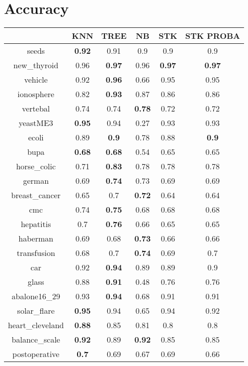 \documentclass{article}%
\begin{document}
%
\normalsize%
\section*{Accuracy}%
\begin{tabular}{c|ccccc}%
&KNN&TREE&NB&STK&STK PROBA\\%
\hline%
seeds&\textbf{0.92}&0.91&0.9&0.9&0.9\\%
new\_thyroid&0.96&\textbf{0.97}&0.96&\textbf{0.97}&\textbf{0.97}\\%
vehicle&0.92&\textbf{0.96}&0.66&0.95&0.95\\%
ionosphere&0.82&\textbf{0.93}&0.87&0.86&0.86\\%
vertebal&0.74&0.74&\textbf{0.78}&0.72&0.72\\%
yeastME3&\textbf{0.95}&0.94&0.27&0.93&0.93\\%
ecoli&0.89&\textbf{0.9}&0.78&0.88&\textbf{0.9}\\%
bupa&\textbf{0.68}&\textbf{0.68}&0.54&0.65&0.65\\%
horse\_colic&0.71&\textbf{0.83}&0.78&0.78&0.78\\%
german&0.69&\textbf{0.74}&0.73&0.69&0.69\\%
breast\_cancer&0.65&0.7&\textbf{0.72}&0.64&0.64\\%
cmc&0.74&\textbf{0.75}&0.68&0.68&0.68\\%
hepatitis&0.7&\textbf{0.76}&0.66&0.65&0.65\\%
haberman&0.69&0.68&\textbf{0.73}&0.66&0.66\\%
transfusion&0.68&0.7&\textbf{0.74}&0.69&0.7\\%
car&0.92&\textbf{0.94}&0.89&0.89&0.9\\%
glass&0.88&\textbf{0.91}&0.48&0.76&0.76\\%
abalone16\_29&0.93&\textbf{0.94}&0.68&0.91&0.91\\%
solar\_flare&\textbf{0.95}&0.94&0.65&0.94&0.92\\%
heart\_cleveland&\textbf{0.88}&0.85&0.81&0.8&0.8\\%
balance\_scale&\textbf{0.92}&0.89&\textbf{0.92}&0.85&0.85\\%
postoperative&\textbf{0.7}&0.69&0.67&0.69&0.66\\%
\end{tabular}

%
\end{document}
